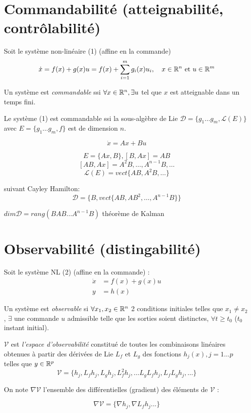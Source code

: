\documentclass[main.tex]{subfiles}
\newcommand{\Lc}{\mathcal{L}}
\newcommand{\D}{\mathcal{D}}
\begin{document}
\section{Commandabilité (atteignabilité, contrôlabilité)}

Soit le système non-linéaire (1) (affine en la commande)
\[ \dot{x} = f(x) + g(x)u = f(x) + \sum_{i=1}^m g_i(x) u_i, \quad x \in \mathbb{R}^n \text{ et }u \in \mathbb{R}^m \]

\begin{defin}
Un système est\emph{ commandable} ssi $\forall x \in \mathbb{R}^n, \exists u$ tel que $x$ est atteignable dans un temps fini.
\end{defin}

\begin{thm}
Le système (1) est commandable ssi la sous-algèbre de Lie $\D = \{g_1 \dots g_m, \Lc(E)\}$ avec $E=\{g_1 \dots g_m,f\}$ est de dimension $n$.
\end{thm}

\begin{exemple}
\[ \dot{x} = Ax + Bu \]

\[ E = \{Ax,B\}, [B,Ax] = AB \]
\[ [AB,Ax] = A^2B, \dots, A^{n-1}B, \dots \]
\[ \Lc(E) = vect \{AB,A^2B,\dots\} \]

suivant Cayley Hamilton:
\[ \D = \{B,vect \{AB,AB^2,\dots,A^{n-1}B\}\}\]

$dim \D = rang (B AB \dots A^{n-1}B)$ théorème de Kalman
\end{exemple}

\section{Observabilité (distingabilité)}
Soit le système NL (2) (affine en la commande) :
\begin{align*}
\dot{x} & = f(x) + g(x)u \\
y & = h(x)
\end{align*}

\begin{defin}
Un système est \emph{observable} si $\forall x_1,x_2 \in \mathbb{R}^n$ 2 conditions initiales telles que $x_1 \neq x_2$, $\exists$ une commande $u$ admissible telle que les sorties soient distinctes, $\forall t \geq t_0$ ($t_0$ instant initial).
\end{defin}

\begin{defin}
$\mathcal{V}$ est \emph{l'espace d'observabilité} constitué de toutes les combinaisons linéaires obtenues à partir des dérivées de Lie $L_f$ et $L_g$ des fonctions $h_j(x),j=1 \dots p$ telles que $y\in\mathbb{R}^p$
\[ \mathcal{V} = \{h_j,L_fh_j, L_g h_j, L^2_f h_j,\dots L_g L_f h_j, L_f L_g h_j,\dots \}\]

On note $\nabla \mathcal{V}$ l'ensemble des différentielles (gradient) des éléments de $\mathcal{V}$ :

\[ \nabla \mathcal{V} = \{ \nabla h_j, \nabla L_f h_j ... \} \]
\end{defin}
\end{document}
